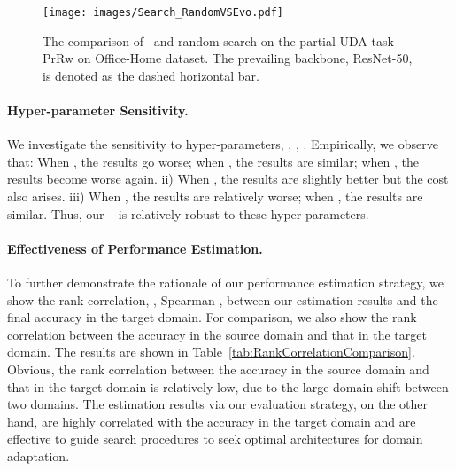 \documentclass[10pt,twocolumn,letterpaper]{article}
\begin{document}
\begin{figure}
    \centering
    \texttt{[image: images/Search\_RandomVSEvo.pdf]}
    \caption{The comparison of \iMethod\, and random search on the partial UDA task PrRw on Office-Home dataset. The prevailing backbone, ResNet-50, is denoted as the dashed horizontal bar.
    }
    \label{fig:VisSearchProcess}
    \vspace{-2mm}
\end{figure} 
\vspace{-2mm}
\paragraph{Hyper-parameter Sensitivity.}
We investigate the sensitivity to  hyper-parameters, , , . Empirically, we observe that: When , the results go worse; when , the results are similar; when , the results become worse again. ii) When , the results are slightly better but the cost also arises. iii) When , the results are relatively worse; when , the results are similar.
Thus, our \iMethod~ is relatively robust to these hyper-parameters.





\vspace{-2mm}
\paragraph{Effectiveness of Performance Estimation.}
To further demonstrate the rationale of our performance estimation strategy, we show the rank correlation, \ie, Spearman , between our estimation results and the final accuracy in the target domain. For comparison, we also show the rank correlation between the accuracy in the source domain and that in the target domain. The results are shown in Table~\ref{tab:RankCorrelationComparison}.
Obvious, the rank correlation between the accuracy in the source domain and that in the target domain is relatively low, due to the large domain shift between two domains. The estimation results via our evaluation strategy, on the other hand, are highly correlated with the accuracy in the target domain and are effective to guide search procedures to seek optimal architectures for domain adaptation.

\begin{table}
    \centering
    \caption{Comparison of the rank correlation between the estimation results via the accuracy on source domain and that via our evaluation protocol.}
    \label{tab:RankCorrelationComparison}
    \small{
    }
\end{table} 
\end{document}
